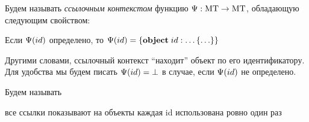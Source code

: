 \begin{Def}
Будем называть \emph{ссылочным контекстом} функцию 
\mbox{$\Psi : \mbox{MT} \rightarrow \mbox{MT}$}, обладающую следующим свойством: 

Если $\Psi(id)$ определено, то $\Psi(id) = \left\{\mathbf{object}\;id : \ldots \left\{ \ldots \right\}\right\}$
\end{Def}

Другими словами, ссылочный контекст ``находит'' объект по его идентификатору. Для удобства мы будем писать $\Psi(id)=\bot$ в случае, если $\Psi(id)$ не определено.

\begin{Def}
Будем называть 
\end{Def}
\begin{Def}
все ссылки показывают на объекты
каждая id использована ровно один раз
\end{Def}


